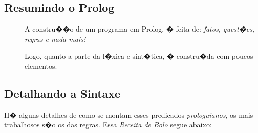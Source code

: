 \documentclass[final,a4paper]{article}
\begin{document}
\newpage
\subsection{Resumindo o Prolog}

\begin{description}

\item [] A constru��o de um
programa em Prolog, � feita de: {\em fatos, quest�es, regras e nada mais!}

\item [] Logo, quanto a parte da l�xica e sint�tica, � constru�da
com poucos elementos.
\end{description} 

\newpage
\subsection{Detalhando a Sintaxe}

  H� alguns detalhes de como se montam
esses predicados {\em prologuianos}, os mais trabalhosos s�o os das regras.
Essa {\em Receita de Bolo} segue abaixo:
\end{document}
